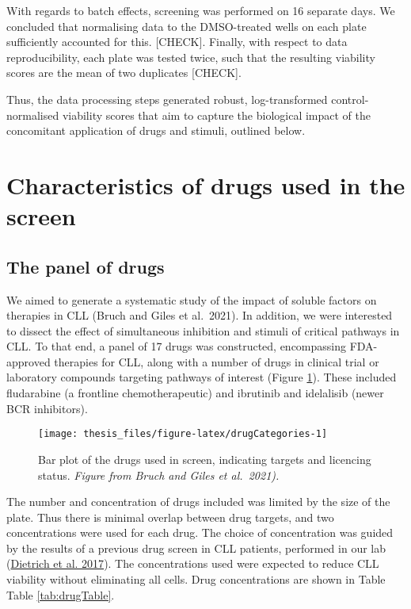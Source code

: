 \documentclass[11pt, a4paper, twosided]{book}
\begin{document}
With regards to batch effects, screening was performed on 16 separate days. We concluded that normalising data to the DMSO-treated wells on each plate sufficiently accounted for this. {[}CHECK{]}. Finally, with respect to data reproducibility, each plate was tested twice, such that the resulting viability scores are the mean of two duplicates {[}CHECK{]}.

Thus, the data processing steps generated robust, log-transformed control-normalised viability scores that aim to capture the biological impact of the concomitant application of drugs and stimuli, outlined below.

\hypertarget{drugs}{%
\section{Characteristics of drugs used in the screen}\label{drugs}}

\hypertarget{the-panel-of-drugs}{%
\subsection{The panel of drugs}\label{the-panel-of-drugs}}

We aimed to generate a systematic study of the impact of soluble factors on therapies in CLL (Bruch and Giles et al.~2021). In addition, we were interested to dissect the effect of simultaneous inhibition and stimuli of critical pathways in CLL. To that end, a panel of 17 drugs was constructed, encompassing FDA-approved therapies for CLL, along with a number of drugs in clinical trial or laboratory compounds targeting pathways of interest (Figure \ref{fig:drugCategories}). These included fludarabine (a frontline chemotherapeutic) and ibrutinib and idelalisib (newer BCR inhibitors).


\begin{figure}

{\centering \texttt{[image: thesis\_files/figure-latex/drugCategories-1]} 

}

\caption{Bar plot of the drugs used in screen, indicating targets and licencing status. \emph{Figure from Bruch and Giles et al.~2021).}}\label{fig:drugCategories}
\end{figure}
The number and concentration of drugs included was limited by the size of the plate. Thus there is minimal overlap between drug targets, and two concentrations were used for each drug. The choice of concentration was guided by the results of a previous drug screen in CLL patients, performed in our lab (\protect\hyperlink{ref-JCIpaper}{Dietrich et al. 2017}). The concentrations used were expected to reduce CLL viability without eliminating all cells. Drug concentrations are shown in Table Table \ref{tab:drugTable}.
\end{document}
